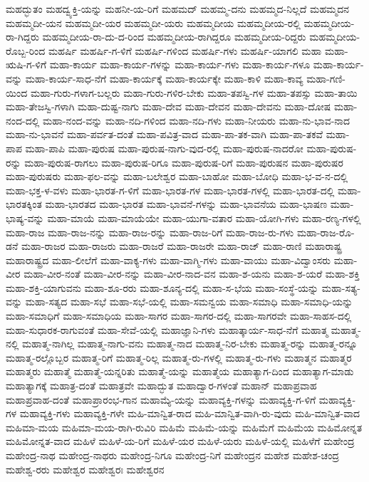 {ಮಹದ್ಭುತಂ
ಮಹದ್ವ್ಯಕ್ತಿ-ಯನ್ನು
ಮಹನೀ-ಯ-ರಿಗೆ
ಮಹಮದ್
ಮಹಮ್ಮ-ದನು
ಮಹಮ್ಮದ-ನಿಲ್ಲದೆ
ಮಹಮ್ಮದನ
ಮಹಮ್ಮದೀ-ಯನ
ಮಹಮ್ಮದೀ-ಯರ
ಮಹಮ್ಮದೀ-ಯರು
ಮಹಮ್ಮದೀಯ
ಮಹಮ್ಮದೀಯ-ರಲ್ಲಿ
ಮಹಮ್ಮದೀಯ-ರಾ-ಗಿದ್ದರು
ಮಹಮ್ಮದೀಯ-ರಾ-ದು-ದ-ರಿಂದ
ಮಹಮ್ಮದೀಯ-ರಾಗಿದ್ದರೂ
ಮಹಮ್ಮದೀಯ-ರಿದ್ದರು
ಮಹಮ್ಮದೀಯ-ರೊಬ್ಬ-ರಿಂದ
ಮಹರ್ಷಿ
ಮಹರ್ಷಿ-ಗ-ಳಿಗೆ
ಮಹರ್ಷಿ-ಗಳಿಂದ
ಮಹರ್ಷಿ-ಗಳು
ಮಹರ್ಷಿ-ಯಾಗಲಿ
ಮಹಾ
ಮಹಾ-ಋಷಿ-ಗ-ಳಿಗೆ
ಮಹಾ-ಕಾರ್ಯ
ಮಹಾ-ಕಾರ್ಯ-ಗಳನ್ನು
ಮಹಾ-ಕಾರ್ಯ-ಗಳು
ಮಹಾ-ಕಾರ್ಯ-ಗಳೂ
ಮಹಾ-ಕಾರ್ಯ-ವನ್ನು
ಮಹಾ-ಕಾರ್ಯ-ಸಾಧ-ನೆಗೆ
ಮಹಾ-ಕಾರ್ಯಕ್ಕೆ
ಮಹಾ-ಕಾರ್ಯಕ್ಕೇ
ಮಹಾ-ಕಾಳಿ
ಮಹಾ-ಕಾವ್ಯ
ಮಹಾ-ಗಣಿ-ಯಿಂದ
ಮಹಾ-ಗುರು-ಗಳಾಗ-ಬಲ್ಲರು
ಮಹಾ-ಗುರು-ಗಳಿರ-ಬೇಕು
ಮಹಾ-ತಪಸ್ವಿ-ಗಳ
ಮಹಾ-ತಪಸ್ಸು
ಮಹಾ-ತಾಯಿ
ಮಹಾ-ತೇಜಸ್ವಿ-ಗಳಾಗಿ
ಮಹಾ-ದುಷ್ಟ-ನಾಗು
ಮಹಾ-ದೇವ
ಮಹಾ-ದೇವನ
ಮಹಾ-ದೇವನು
ಮಹಾ-ದೋಷ
ಮಹಾ-ನಂದ-ದಲ್ಲಿ
ಮಹಾ-ನಂದ-ವನ್ನು
ಮಹಾ-ನದಿ-ಗಳಿಂದ
ಮಹಾ-ನದಿ-ಗಳು
ಮಹಾ-ನೀಯರು
ಮಹಾ-ನು-ಭಾವ-ನಾದ
ಮಹಾ-ನು-ಭಾವನೆ
ಮಹಾ-ಪರ್ವತ-ದಂತೆ
ಮಹಾ-ಪವಿತ್ರ-ವಾದ
ಮಹಾ-ಪಾ-ತಕ-ವಾಗಿ
ಮಹಾ-ಪಾ-ತಕವೆ
ಮಹಾ-ಪಾಪ
ಮಹಾ-ಪಾಪಿ
ಮಹಾ-ಪುರುಷ
ಮಹಾ-ಪುರುಷ-ನಾಗು-ವುದ-ರಲ್ಲಿ
ಮಹಾ-ಪುರುಷ-ನಾದರೋ
ಮಹಾ-ಪುರುಷ-ರನ್ನು
ಮಹಾ-ಪುರುಷ-ರಾಗಲು
ಮಹಾ-ಪುರುಷ-ರಿಗೂ
ಮಹಾ-ಪುರುಷ-ರಿಗೆ
ಮಹಾ-ಪುರುಷನ
ಮಹಾ-ಪುರುಷರ
ಮಹಾ-ಪುರುಷರು
ಮಹಾ-ಫಲ-ವನ್ನು
ಮಹಾ-ಬಲೇಶ್ವರ
ಮಹಾ-ಬಾಹೋ
ಮಹಾ-ಬೋಧಿ
ಮಹಾ-ಭ-ವ-ನ-ದಲ್ಲಿ
ಮಹಾ-ಭಕ್ತ-ಳ-ವಳು
ಮಹಾ-ಭಾರತ-ಗ-ಳಿಗೆ
ಮಹಾ-ಭಾರತ-ಗಳ
ಮಹಾ-ಭಾರತ-ಗಳಲ್ಲಿ
ಮಹಾ-ಭಾರತ-ದಲ್ಲಿ
ಮಹಾ-ಭಾರತಕ್ಕಿಂತ
ಮಹಾ-ಭಾರತದ
ಮಹಾ-ಭಾರತ
ಮಹಾ-ಭಾವನೆ-ಗಳನ್ನು
ಮಹಾ-ಭಾವನೆಯ
ಮಹಾ-ಭಾಷಣ
ಮಹಾ-ಭಾಷ್ಯ-ವನ್ನು
ಮಹಾ-ಮಾಯೆ
ಮಹಾ-ಮಾಯೆಯೇ
ಮಹಾ-ಯುಗಾ-ವತಾರ
ಮಹಾ-ಯೋಗಿ-ಗಳು
ಮಹಾ-ರಣ್ಯ-ಗಳಲ್ಲಿ
ಮಹಾ-ರಾಜ
ಮಹಾ-ರಾಜ-ನನ್ನು
ಮಹಾ-ರಾಜ-ರನ್ನು
ಮಹಾ-ರಾಜ-ರಿಗೆ
ಮಹಾ-ರಾಜ-ರು-ಗಳು
ಮಹಾ-ರಾಜ-ರೊ-ಡನೆ
ಮಹಾ-ರಾಜರ
ಮಹಾ-ರಾಜರು
ಮಹಾ-ರಾಜರೆ
ಮಹಾ-ರಾಜರೇ
ಮಹಾ-ರಾಜ್
ಮಹಾ-ರಾಣಿ
ಮಹಾರಾಷ್ಟ್ರ
ಮಹಾರಾಷ್ಟ್ರದ
ಮಹಾ-ಲೀಲೆಗೆ
ಮಹಾ-ವಾಕ್ಯ-ಗಳು
ಮಹಾ-ವಾಗ್ಮಿ-ಗಳು
ಮಹಾ-ವಾಯು
ಮಹಾ-ವಿದ್ವಾಂಸರು
ಮಹಾ-ವೀರ
ಮಹಾ-ವೀರ-ನಂತೆ
ಮಹಾ-ವೀರ-ನನ್ನು
ಮಹಾ-ವೀರ-ನಾದ-ವನ
ಮಹಾ-ಶ-ಯನು
ಮಹಾ-ಶ-ಯರೆ
ಮಹಾ-ಶಕ್ತಿ
ಮಹಾ-ಶಕ್ತಿ-ಯಾಗುವನು
ಮಹಾ-ಶೂ-ರರು
ಮಹಾ-ಶೂನ್ಯ-ದಲ್ಲಿ
ಮಹಾ-ಸ-ಭೆಯ
ಮಹಾ-ಸಂಸ್ಥೆ-ಯನ್ನು
ಮಹಾ-ಸತ್ಯ-ವನ್ನು
ಮಹಾ-ಸತ್ಯದ
ಮಹಾ-ಸಭೆ
ಮಹಾ-ಸಭೆ-ಯಲ್ಲಿ
ಮಹಾ-ಸಮನ್ವಯ
ಮಹಾ-ಸಮಾಧಿ
ಮಹಾ-ಸಮಾಧಿ-ಯನ್ನು
ಮಹಾ-ಸಮಾಧಿಗೆ
ಮಹಾ-ಸಮಾಧಿಯ
ಮಹಾ-ಸಾಗರ
ಮಹಾ-ಸಾಗರ-ದಲ್ಲಿ
ಮಹಾ-ಸಾಗರವೇ
ಮಹಾ-ಸಾಹಸ-ದಲ್ಲಿ
ಮಹಾ-ಸುಧಾರಕ-ರಾಗುವಂತೆ
ಮಹಾ-ಸೇವೆ-ಯಲ್ಲಿ
ಮಹಾಜ್ಞಾನಿ-ಗಳು
ಮಹಾತ್ಕಾರ್ಯ-ಸಾಧ-ನೆಗೆ
ಮಹಾತ್ಮ
ಮಹಾತ್ಮ-ನಲ್ಲಿ
ಮಹಾತ್ಮ-ನಾಗಿಲ್ಲ
ಮಹಾತ್ಮ-ನಾಗು-ವನು
ಮಹಾತ್ಮ-ನಾದ
ಮಹಾತ್ಮ-ನಿರ-ಬೇಕು
ಮಹಾತ್ಮ-ರನ್ನು
ಮಹಾತ್ಮ-ರನ್ನೂ
ಮಹಾತ್ಮ-ರಲ್ಲೊಬ್ಬರ
ಮಹಾತ್ಮ-ರಿಗೆ
ಮಹಾತ್ಮ-ರಿಲ್ಲ
ಮಹಾತ್ಮ-ರು-ಗಳಲ್ಲಿ
ಮಹಾತ್ಮ-ರು-ಗಳು
ಮಹಾತ್ಮನ
ಮಹಾತ್ಮರ
ಮಹಾತ್ಮರು
ಮಹಾತ್ಮೆ
ಮಹಾತ್ಮೆ-ಯನ್ನರಿತು
ಮಹಾತ್ಮೆ-ಯನ್ನು
ಮಹಾತ್ಮೆಯ
ಮಹಾತ್ಯಾಗ-ದಿಂದ
ಮಹಾತ್ಯಾಗ-ಮಾಡು
ಮಹಾತ್ಯಾಗಕ್ಕೆ
ಮಹಾತ್ರ-ದಂತೆ
ಮಹಾತ್ರವೇ
ಮಹಾದ್ಭುತ
ಮಹಾದ್ವಾರ-ಗಳಂತೆ
ಮಹಾನ್
ಮಹಾಪ್ರವಾಹ
ಮಹಾಪ್ರವಾಹ-ದಂತೆ
ಮಹಾಪ್ರಾರಂಭ-ಗಾನ
ಮಹಾಮ್ಯೆ-ಯನ್ನು
ಮಹಾವ್ಯಕ್ತಿ-ಗಳನ್ನು
ಮಹಾವ್ಯಕ್ತಿ-ಗ-ಳಿಗೆ
ಮಹಾವ್ಯಕ್ತಿ-ಗಳ
ಮಹಾವ್ಯಕ್ತಿ-ಗಳು
ಮಹಾವ್ಯಕ್ತಿ-ಗಳೇ
ಮಹಿ-ಮಾನ್ವಿತ-ರಾದ
ಮಹಿ-ಮಾನ್ವಿತ-ವಾಗಿ-ರು-ವುದು
ಮಹಿ-ಮಾನ್ವಿತ-ವಾದ
ಮಹಿಮಾ-ಮಯ
ಮಹಿಮಾ-ಮಯ-ರಾಗಿ-ರುವಿರಿ
ಮಹಿಮೆ
ಮಹಿಮೆ-ಯನ್ನು
ಮಹಿಮೆಗೆ
ಮಹಿಮೆಯ
ಮಹಿಮೋನ್ನತ
ಮಹಿಮೋನ್ನತ-ವಾದ
ಮಹಿಳೆ
ಮಹಿಳೆ-ಯ-ರಿಗೆ
ಮಹಿಳೆ-ಯರ
ಮಹಿಳೆ-ಯರು
ಮಹಿಳೆ-ಯಲ್ಲಿ
ಮಹಿಳೆಗೆ
ಮಹೇಂದ್ರ
ಮಹೇಂದ್ರ-ನಾಥ
ಮಹೇಂದ್ರ-ನಾಥರು
ಮಹೇಂದ್ರ-ನಿಗೂ
ಮಹೇಂದ್ರ-ನಿಗೆ
ಮಹೇಂದ್ರನ
ಮಹೇಶ
ಮಹೇಶ-ಚಂದ್ರ
ಮಹೇಶ್ವ-ರರು
ಮಹೇಶ್ವರ
ಮಹೇಶ್ವರಃ
ಮಹೇಶ್ವರನ
}

